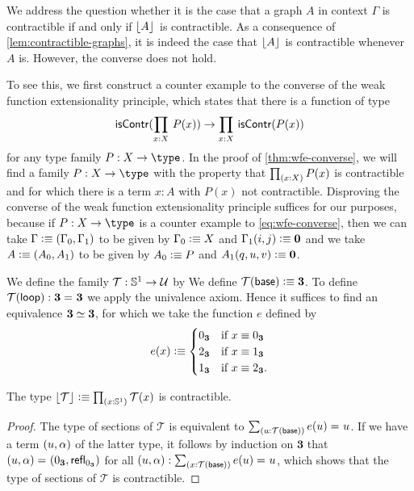 \begin{rmk}
We address the question whether it is the case that a graph $A$ in context
$\Gamma$ is contractible if and only if $\lfloor A \rfloor^{}$ is contractible. As a
consequence of \autoref{lem:contractible-graphs}, it is indeed the case
that $\lfloor A \rfloor^{}$ is contractible whenever $A$ is. However, the converse
does not hold.

To see this, we first construct a counter example to the converse of the
weak function extensionality principle, which states that there is a function
of type
\begin{equation}
\iscontr(\prd{x:X}P(x))\to\prd{x:X}\iscontr(P(x))\label{eq:wfe-converse}
\end{equation}
for any type family $P:X\to\type$. In the proof of \autoref{thm:wfe-converse}, 
we will find a family
$P:X\to\type$ with the property that $\prd{x:X}P(x)$ is contractible and for
which there is a term $x:A$ with $P(x)$ not contractible. Disproving the
converse of the weak function extensionality principle suffices for our
purposes, because if $P:X\to\type$ is a counter example to \autoref{eq:wfe-converse},
then we can take $\Gamma\vcentcolon\equiv{\mathopen{}(\Gamma_0,\Gamma_1)\mathclose{}}$ to be given by
$\Gamma_0\vcentcolon\equiv X$ and $\Gamma_1(i,j)\vcentcolon\equiv\mathbf{0}$ and we take
$A\vcentcolon\equiv{\mathopen{}(A_0,A_1)\mathclose{}}$ to be given by $A_0\vcentcolon\equiv P$ and $A_1(q,u,v)
\vcentcolon\equiv\mathbf{0}$.
\end{rmk}

We define the family $\mathcal{T}:\mathbb{S}^1\to\mathcal{U}$ by
We define $\mathcal{T}(\mathsf{base})\vcentcolon\equiv\mathbf{3}$. To define $\mathcal{T}(\mathsf{loop}):
\mathbf{3} =_{} \mathbf{3}$ we apply the univalence axiom. Hence it suffices to find an
equivalence $\mathbf{3} \simeq \mathbf{3}$, for which we take the function
$e$ defined by
\begin{equation*}
e(x)\vcentcolon\equiv\begin{cases}
0_\mathbf{3} & \text{if }x\equiv 0_\mathbf{3}\\
2_\mathbf{3} & \text{if }x\equiv 1_\mathbf{3}\\
1_\mathbf{3} & \text{if }x\equiv 2_\mathbf{3}.
\end{cases}
\end{equation*}

\begin{lem}
The type $\terms{\mathcal{T}}\defeq\prd{x:\Sn^1}\mathcal{T}(x)$ is contractible.
\end{lem}

\begin{proof}
The type of sections of $\mathcal{T}$ is equivalent to $\sm{u:\mathcal{T}(\base)}\id{e(u)}{u}$.
If we have a term ${\mathopen{}(u,\alpha)\mathclose{}}$ of the latter type, it follows by induction
on $\mathbf{3}$ that ${\mathopen{}(u,\alpha)\mathclose{}} =_{} {\mathopen{}(0_\mathbf{3},\mathsf{refl}_{0_\mathbf{3}})\mathclose{}}$ for all $\pairr{u,\alpha}:
\sm{x:\mathcal{T}(\base)}\id{e(u)}{u}$,
which shows that the type of sections of $\mathcal{T}$ is contractible.
\end{proof}

